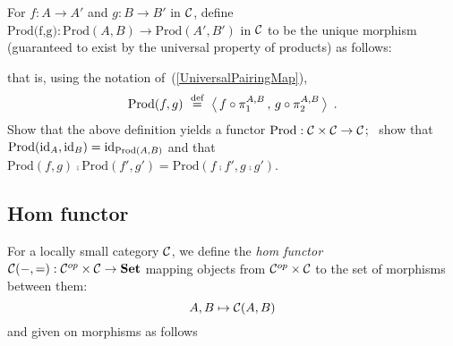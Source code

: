 \begin{exercise}\label{ex:prodfunc}
For $f: A\to A'$ and $g:B\to B'$ in $\mathcal{C}$, define
$\textrm{Prod(f,g)}:\textrm{Prod}(A,B)\to\textrm{Prod}(A',B')$ in $\mathcal{C}$
to be the unique morphism (guaranteed to exist by the universal property of
products) as follows:
\begin{center}
\end{center}
that is, using the notation of~(\ref{UniversalPairingMap}),
\[
  \textrm{Prod}(f,g)
  \ \stackrel{\text{def}}{=} \
  \big\langle \, f\circ\pi^{A,B}_1 \, , \, g\circ\pi^{A,B}_2 \, \big\rangle
  \enspace.
\]
Show that the above definition yields a functor
$\textrm{Prod}:\mathcal{C}\times\mathcal{C}\to \mathcal{C}$; \ie~show that
$\mathrm{Prod}(\mathrm{id}_{ A }, \mathrm{id}_{ B }) = \mathrm{id}_{ \mathrm{Prod}(A,B) }$ and that
$\mathrm{Prod}(f, g) \comp \mathrm{Prod}(f', g')
 = \mathrm{Prod}(f \comp f', g \comp g')$.
\end{exercise}

\subsection{Hom functor}

For a locally small category $\mathcal{C}$, we define the \emph{hom functor}
$\mathcal{C}(-, =): \mathcal{C}^{op} \times \mathcal{C} \to \mathbf {Set}$ mapping objects
from $\mathcal{C}^{op} \times \mathcal{C}$ to the set of morphisms between them:
$$
  A, B \mapsto \mathcal{C}(A, B)
$$
and given on morphisms as follows
\begin{center}
\end{center}


